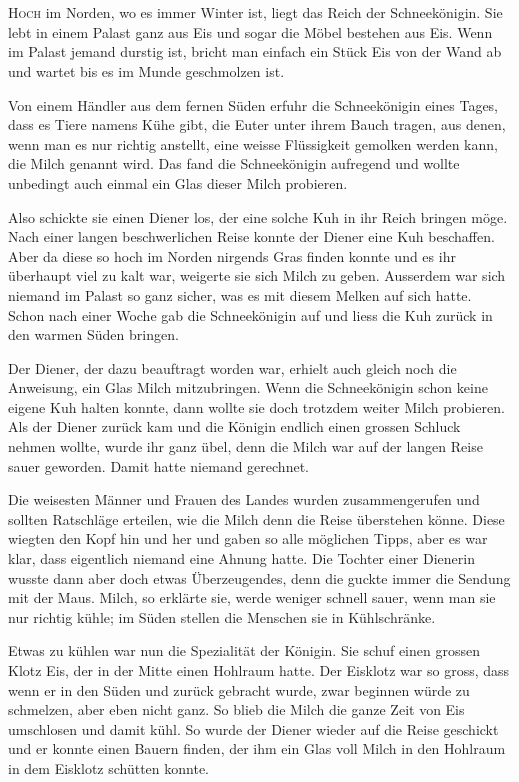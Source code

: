 \chapter*{}
\lettrine[lines=3]{\color{red}H}{och} im Norden, wo es immer Winter ist, liegt das Reich der Schneekönigin. Sie lebt in einem Palast ganz aus Eis und sogar die Möbel bestehen aus Eis. Wenn im Palast jemand durstig ist, bricht man einfach ein Stück Eis von der Wand ab und wartet bis es im Munde geschmolzen ist.

Von einem Händler aus dem fernen Süden erfuhr die Schneekönigin eines Tages, dass es Tiere namens Kühe gibt, die Euter unter ihrem Bauch tragen, aus denen, wenn man es nur richtig anstellt, eine weisse Flüssigkeit gemolken werden kann, die Milch genannt wird. Das fand die Schneekönigin aufregend und wollte unbedingt auch einmal ein Glas dieser Milch probieren.

Also schickte sie einen Diener los, der eine solche Kuh in ihr Reich bringen möge. Nach einer langen beschwerlichen Reise konnte der Diener eine Kuh beschaffen. Aber da diese so hoch im Norden nirgends Gras finden konnte und es ihr überhaupt viel zu kalt war, weigerte sie sich Milch zu geben. Ausserdem war sich niemand im Palast so ganz sicher, was es mit diesem Melken auf sich hatte. Schon nach einer Woche gab die Schneekönigin auf und liess die Kuh zurück in den warmen Süden bringen.

Der Diener, der dazu beauftragt worden war, erhielt auch gleich noch die Anweisung, ein Glas Milch mitzubringen. Wenn die Schneekönigin schon keine eigene Kuh halten konnte, dann wollte sie doch trotzdem weiter Milch probieren. Als der Diener zurück kam und die Königin endlich einen grossen Schluck nehmen wollte, wurde ihr ganz übel, denn die Milch war auf der langen Reise sauer geworden. Damit hatte niemand gerechnet. 

Die weisesten Männer und Frauen des Landes wurden zusammengerufen und sollten Ratschläge erteilen, wie die Milch denn die Reise überstehen könne. Diese wiegten den Kopf hin und her und gaben so alle möglichen Tipps, aber es war klar, dass eigentlich niemand eine Ahnung hatte. Die Tochter einer Dienerin wusste dann aber doch etwas Überzeugendes, denn die guckte immer die Sendung mit der Maus. Milch, so erklärte sie, werde weniger schnell sauer, wenn man sie nur richtig kühle; im Süden stellen die Menschen sie in Kühlschränke.

Etwas zu kühlen war nun die Spezialität der Königin. Sie schuf einen grossen Klotz Eis, der in der Mitte einen Hohlraum hatte. Der Eisklotz war so gross, dass wenn er in den Süden und zurück gebracht wurde, zwar beginnen würde zu schmelzen, aber eben nicht ganz. So blieb die Milch die ganze Zeit von Eis umschlosen und damit kühl. So wurde der Diener wieder auf die Reise geschickt und er konnte einen Bauern finden, der ihm ein Glas voll Milch in den Hohlraum in dem Eisklotz schütten konnte.

